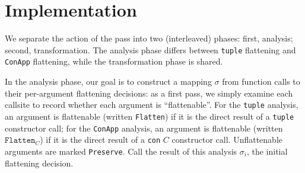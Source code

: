 










\section{Implementation}
We separate the action of the pass into two (interleaved) phases: first,
analysis; second, transformation. The analysis phase differs
between \texttt{tuple} flattening and \texttt{ConApp} flattening, while the
transformation phase is shared.

In the analysis phase, our goal is to construct a mapping $\sigma$ from function
calls to their per-argument flattening decisions: as a first pass, we simply
examine each callsite to record whether each argument is ``flattenable''. For
the \texttt{tuple} analysis, an argument is flattenable
(written \texttt{Flatten}) if it is the direct result of a \texttt{tuple}
constructor call; for the \texttt{ConApp} analysis, an argument is flattenable
(written $\texttt{Flatten}_C$) if it is the direct result of a \texttt{con} $C$
constructor call. Unflattenable arguments are marked \texttt{Preserve}. Call
the result of this analysis $\sigma_i$, the initial flattening decision.

